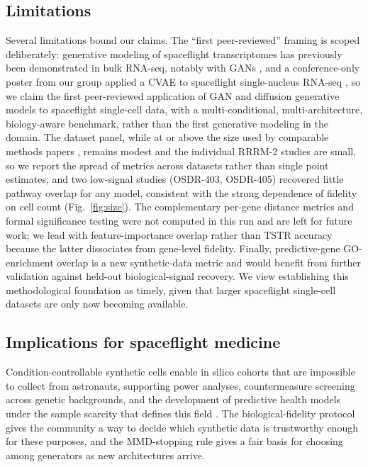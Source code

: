 \documentclass[11pt]{article}
\newcommand{\protname}{biological-fidelity protocol}
\begin{document}
\subsection{Limitations}
Several limitations bound our claims. The ``first peer-reviewed'' framing is scoped deliberately: generative modeling of spaceflight transcriptomes has previously been demonstrated in bulk RNA-seq, notably with GANs \cite{ganbio}, and a conference-only poster from our group applied a CVAE to spaceflight single-nucleus RNA-seq \cite{ntrs,glare}, so we claim the first peer-reviewed application of GAN and diffusion generative models to spaceflight single-cell data, with a multi-conditional, multi-architecture, biology-aware benchmark, rather than the first generative modeling in the domain. The dataset panel, while at or above the size used by comparable methods papers \cite{cfgen,scdiffusion,cfdiffusion}, remains modest and the individual RRRM-2 studies are small, so we report the spread of metrics across datasets rather than single point estimates, and two low-signal studies (OSDR-403, OSDR-405) recovered little pathway overlap for any model, consistent with the strong dependence of fidelity on cell count (Fig.~\ref{fig:size}). The complementary per-gene distance metrics and formal significance testing were not computed in this run and are left for future work; we lead with feature-importance overlap rather than TSTR accuracy because the latter dissociates from gene-level fidelity. Finally, predictive-gene GO-enrichment overlap is a new synthetic-data metric and would benefit from further validation against held-out biological-signal recovery. We view establishing this methodological foundation as timely, given that larger spaceflight single-cell datasets are only now becoming available.

\subsection{Implications for spaceflight medicine}
Condition-controllable synthetic cells enable in silico cohorts that are impossible to collect from astronauts, supporting power analyses, countermeasure screening across genetic backgrounds, and the development of predictive health models under the sample scarcity that defines this field \cite{scott,ilangovan}. The \protname{} gives the community a way to decide which synthetic data is trustworthy enough for these purposes, and the MMD-stopping rule gives a fair basis for choosing among generators as new architectures arrive.
\end{document}
